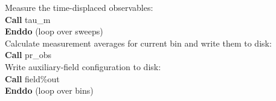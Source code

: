 \begin{mdframed}[frametitle={Basic structure of the auxiliary-field QMC implementation (\path{Prog/main.F90}):}]
{\hspace*{2em} Measure the time-displaced observables: \\
\hspace*{2em} \textbf{Call} tau\_m\\
\hspace*{1em} \textbf{Enddo} (loop over sweeps)\\
    
\hspace*{1em} Calculate measurement averages for current bin and write them to disk:\\
\hspace*{1em} \textbf{Call} pr\_obs\\
\hspace*{1em} Write auxiliary-field configuration to disk: \\
\hspace*{1em} \textbf{Call} field\%out\\
\textbf{Enddo} (loop over bins)\\
% 
}
\end{mdframed}
% 
% 
% 
% 
% 
% 
% 
%    
%       
%          
%                         
